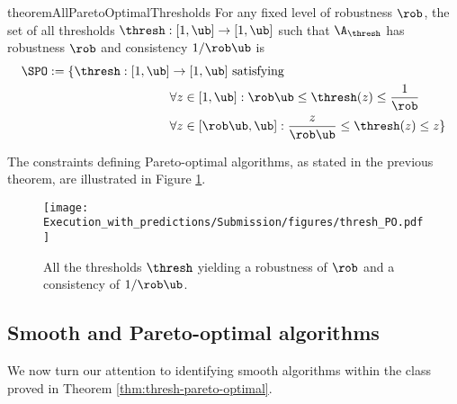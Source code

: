 \begin{restatable}{theorem}{AllParetoOptimalThresholds}\label{thm:thresh-pareto-optimal}
For any fixed level of robustness $\rob$, the set of all thresholds $\thresh: [1,\ub] \to [1,\ub]$ such that $\A_\thresh$ has robustness $\rob$ and consistency $1/\rob\ub$ is 
\begin{align*}
\SPO := \{ \thresh : [1,\ub]& \to [1,\ub] \text{ satisfying }\\
&\forall z \in [1,\ub]: \rob \ub \leq \thresh(z) \leq \frac{1}{\rob}\\
&\forall z \in [\rob \ub,\ub]: \frac{z}{\rob \ub} \leq \thresh(z) \leq z \}
\end{align*}
\end{restatable}

The constraints defining Pareto-optimal algorithms, as stated in the previous theorem, are illustrated in Figure \ref{fig:thresh_pareto_optimal}.

\begin{figure}[t]
    \centering
    \texttt{[image: Execution\_with\_predictions/Submission/figures/thresh\_PO.pdf]}
    \caption{All the thresholds $\thresh$ yielding a robustness of $\rob$ and a consistency of $1/\rob \ub$.}
    \label{fig:thresh_pareto_optimal}
\end{figure}


\subsection{Smooth and Pareto-optimal algorithms}
We now turn our attention to identifying smooth algorithms within the class proved in Theorem \ref{thm:thresh-pareto-optimal}.

